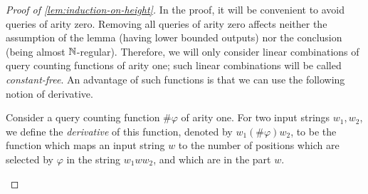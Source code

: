 \begin{proof}[Proof of \cref{lem:induction-on-height}]
In the proof, it will be convenient to avoid queries of arity zero. Removing all queries of arity zero affects neither the assumption of the lemma (having lower bounded outputs)  nor the conclusion (being almost ${\mathbb N}$-regular). Therefore, we will only consider linear combinations of query counting functions of arity one; such linear combinations will be called \emph{constant-free}.
An advantage of such functions is that we can use the following notion of derivative. 

\begin{definition}[Derivative]
    Consider a query counting function $\#\varphi$ of arity one. For two input strings $w_1, w_2$, we define the \emph{derivative} of this function, denoted by $w_1 (\#\varphi) w_2$, to be the function which maps an input string $w$ to the number of positions which are selected by $\varphi$ in the string $w_1 w w_2$, and which are in the part $w$.
\end{definition}







\end{proof}
